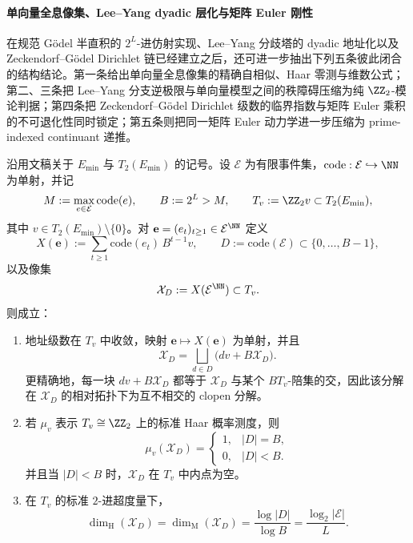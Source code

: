 \paragraph{单向量全息像集、Lee--Yang dyadic 层化与矩阵 Euler 刚性}
在规范 Gödel 半直积的 \(2^L\)-进仿射实现、Lee--Yang 分歧塔的 dyadic 地址化以及 Zeckendorf--Gödel Dirichlet 链已经建立之后，还可进一步抽出下列五条彼此闭合的结构结论。第一条给出单向量全息像集的精确自相似、Haar 零测与维数公式；第二、三条把 Lee--Yang 分支逆极限与单向量模型之间的秩障碍压缩为纯 \(\ZZ_2\)-模论判据；第四条把 Zeckendorf--Gödel Dirichlet 级数的临界指数与矩阵 Euler 乘积的不可退化性同时锁定；第五条则把同一矩阵 Euler 动力学进一步压缩为 prime-indexed continuant 递推。

\begin{conclusion}\label{con:xi-time-part62b-rankone-hologram-selfsimilar-measure-dimension}
沿用文稿关于 \(E_{\min}\) 与 \(T_2(E_{\min})\) 的记号。设 \(\mathcal E\) 为有限事件集，\(\mathrm{code}:\mathcal E\hookrightarrow \NN\) 为单射，并记
\[
M:=\max_{e\in\mathcal E}\mathrm{code}(e),
\qquad
B:=2^L>M,
\qquad
T_v:=\ZZ_2v\subset T_2(E_{\min}),
\]
其中 \(v\in T_2(E_{\min})\setminus\{0\}\)。对 \(\mathbf e=(e_t)_{t\ge 1}\in\mathcal E^{\NN}\) 定义
\[
X(\mathbf e):=\sum_{t\ge 1}\mathrm{code}(e_t)\,B^{t-1}v,
\qquad
D:=\mathrm{code}(\mathcal E)\subset\{0,\dots,B-1\},
\]
以及像集
\[
\mathcal X_D:=X(\mathcal E^{\NN})\subset T_v.
\]
则成立：
\begin{enumerate}
  \item 地址级数在 \(T_v\) 中收敛，映射 \(\mathbf e\mapsto X(\mathbf e)\) 为单射，并且
  \[
  \mathcal X_D=\bigsqcup_{d\in D}\bigl(dv+B\mathcal X_D\bigr).
  \]
  更精确地，每一块 \(dv+B\mathcal X_D\) 都等于 \(\mathcal X_D\) 与某个 \(B T_v\)-陪集的交，因此该分解在 \(\mathcal X_D\) 的相对拓扑下为互不相交的 clopen 分解。
  \item 若 \(\mu_v\) 表示 \(T_v\cong \ZZ_2\) 上的标准 Haar 概率测度，则
  \[
  \mu_v(\mathcal X_D)=
  \begin{cases}
  1,& |D|=B,\\
  0,& |D|<B.
  \end{cases}
  \]
  并且当 \(|D|<B\) 时，\(\mathcal X_D\) 在 \(T_v\) 中内点为空。
  \item 在 \(T_v\) 的标准 \(2\)-进超度量下，
  \[
  \dim_{\mathrm H}(\mathcal X_D)
  =
  \dim_{\mathrm M}(\mathcal X_D)
  =
  \frac{\log |D|}{\log B}
  =
  \frac{\log_2|\mathcal E|}{L}.
  \]
\end{enumerate}
\end{conclusion}
